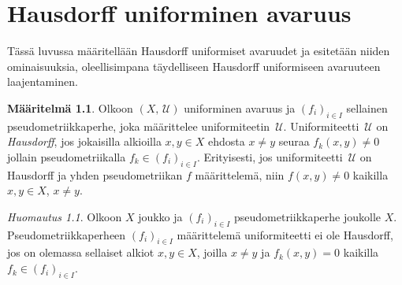 \documentclass[12pt,a4paper,leqno]{report}
\newcommand{\U}{\,\mathcal{U}}
\theoremstyle{plain}
\newtheorem{lem}[equation]{Lemma}
\theoremstyle{definition}
\newtheorem{maar}[equation]{Määritelmä}
\theoremstyle{remark}
\newtheorem{huom}[equation]{Huomautus}
\begin{document}
\chapter{Hausdorff uniforminen avaruus}
Tässä luvussa määritellään Hausdorff uniformiset avaruudet ja 
esitetään niiden ominaisuuksia, 
oleellisimpana täydelliseen Hausdorff uniformiseen avaruuteen laajentaminen.
\begin{maar}
Olkoon $(X,\U)$ uniforminen avaruus ja $(f_i)_{i\in I}$ sellainen 
pseudometriikkaperhe, joka määrittelee uniformiteetin $\U$. 
Uniformiteetti $\U$ on \emph{Hausdorff}, jos jokaisilla alkioilla 
$x,y\in X$ ehdosta $x\neq y$ seuraa $f_k(x,y)\neq 0$ 
jollain pseudometriikalla $f_k\in(f_i)_{i\in I}$. 
Erityisesti, jos uniformiteetti $\U$ on Hausdorff 
ja yhden pseudometriikan $f$ määrittelemä, 
niin $f(x,y)\neq 0$ kaikilla $x,y\in X$, $x\neq y$.
\end{maar}
\begin{huom}
Olkoon $X$ joukko ja $(f_i)_{i\in I}$ pseudometriikkaperhe joukolle $X$. 
Pseudometriikkaperheen $(f_i)_{i\in I}$ määrittelemä uniformiteetti ei ole 
Hausdorff, jos on olemassa sellaiset alkiot $x,y\in X$, 
joilla $x\neq y$ ja $f_k(x,y)=0$ kaikilla $f_k\in (f_i)_{i\in I}$.
\end{huom}
\end{document}
